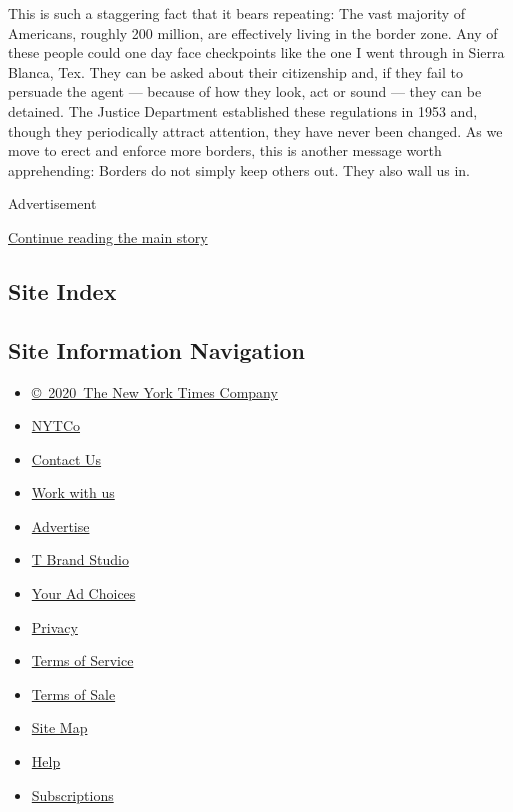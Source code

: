 This is such a staggering fact that it bears repeating: The vast
majority of Americans, roughly 200 million, are effectively living in
the border zone. Any of these people could one day face checkpoints like
the one I went through in Sierra Blanca, Tex. They can be asked about
their citizenship and, if they fail to persuade the agent --- because of
how they look, act or sound --- they can be detained. The Justice
Department established these regulations in 1953 and, though they
periodically attract attention, they have never been changed. As we move
to erect and enforce more borders, this is another message worth
apprehending: Borders do not simply keep others out. They also wall us
in.

Advertisement

\protect\hyperlink{after-bottom}{Continue reading the main story}

\hypertarget{site-index}{%
\subsection{Site Index}\label{site-index}}

\hypertarget{site-information-navigation}{%
\subsection{Site Information
Navigation}\label{site-information-navigation}}

\begin{itemize}
\tightlist
\item
  \href{https://help.nytimes3xbfgragh.onion/hc/en-us/articles/115014792127-Copyright-notice}{©~2020~The
  New York Times Company}
\end{itemize}

\begin{itemize}
\tightlist
\item
  \href{https://www.nytco.com/}{NYTCo}
\item
  \href{https://help.nytimes3xbfgragh.onion/hc/en-us/articles/115015385887-Contact-Us}{Contact
  Us}
\item
  \href{https://www.nytco.com/careers/}{Work with us}
\item
  \href{https://nytmediakit.com/}{Advertise}
\item
  \href{http://www.tbrandstudio.com/}{T Brand Studio}
\item
  \href{https://www.nytimes3xbfgragh.onion/privacy/cookie-policy\#how-do-i-manage-trackers}{Your
  Ad Choices}
\item
  \href{https://www.nytimes3xbfgragh.onion/privacy}{Privacy}
\item
  \href{https://help.nytimes3xbfgragh.onion/hc/en-us/articles/115014893428-Terms-of-service}{Terms
  of Service}
\item
  \href{https://help.nytimes3xbfgragh.onion/hc/en-us/articles/115014893968-Terms-of-sale}{Terms
  of Sale}
\item
  \href{https://spiderbites.nytimes3xbfgragh.onion}{Site Map}
\item
  \href{https://help.nytimes3xbfgragh.onion/hc/en-us}{Help}
\item
  \href{https://www.nytimes3xbfgragh.onion/subscription?campaignId=37WXW}{Subscriptions}
\end{itemize}
